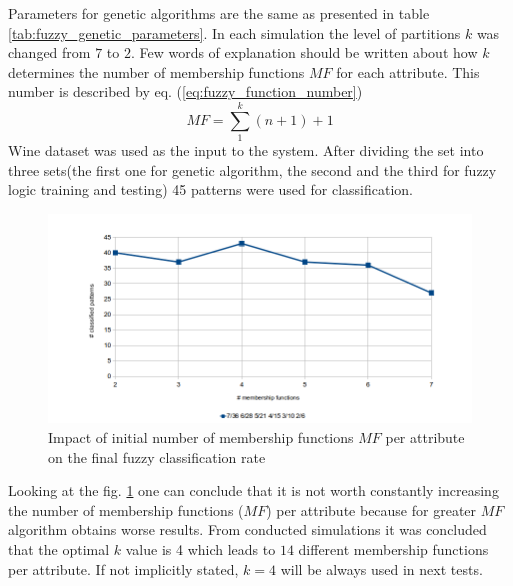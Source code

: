 Parameters for genetic algorithms are the same as presented in table \ref{tab:fuzzy_genetic_parameters}. 
In each simulation the level of partitions $k$ was changed from $7$ to $2$. Few words of explanation should be
written about how $k$ determines the number of membership functions $MF$ for each
attribute. This number is described by eq. (\ref{eq:fuzzy_function_number})
\begin{equation}
    MF = \sum\limits_1^k (n + 1) + 1
    \label{eq:fuzzy_function_number}
\end{equation}
Wine dataset was used as the input to the system. After dividing the set into
three sets(the first one for genetic algorithm, the second and the third for
fuzzy logic training and testing) 45 patterns were used for classification. 

\begin{figure}[H]
    \begin{center}
        \includegraphics[width=\textwidth]{fig/fuzzy_functions.png}
    \end{center}
    \caption{Impact of initial number of membership functions $MF$ per attribute on
    the final fuzzy classification rate}
    \label{fig:fuzzy_functions}
\end{figure}
Looking at the fig. \ref{fig:fuzzy_functions} one can conclude that it is not
worth constantly increasing the number of membership functions ($MF$) per attribute
because for greater $MF$ algorithm obtains worse results. From conducted simulations 
it was concluded that the optimal $k$ value is 4 which leads to $14$
different membership functions per attribute. If not implicitly stated, $k=4$
will be always used in next tests.

